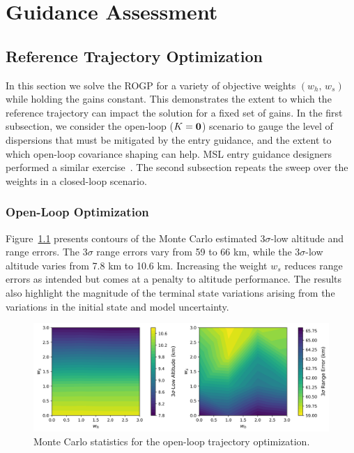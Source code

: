 \chapter{Guidance Assessment}\label{Ch:NumericalAssessment}

\section{Reference Trajectory Optimization}
In this section we solve the ROGP for a variety of objective weights $(w_h,\,w_s)$ while holding the gains constant. This demonstrates the extent to which the reference trajectory can impact the solution for a fixed set of gains. In the first subsection, we consider the open-loop ($K=\mathbf{0}$) scenario to gauge the level of dispersions that must be mitigated by the entry guidance, and the extent to which open-loop covariance shaping can help. MSL entry guidance designers performed a similar exercise~\cite{MSL_EDL2}. The second subsection repeats the sweep over the weights in a closed-loop scenario.

\subsection{Open-Loop Optimization}
Figure~\ref{Fig:MCResultsOpenLoop} presents contours of the Monte Carlo estimated 3$\sigma$-low altitude and range errors. The 3$\sigma$ range errors vary from 59 to 66 km, while the 3$\sigma$-low altitude varies from 7.8 km to 10.6 km. Increasing the weight $w_s$ reduces range errors as intended but comes at a penalty to altitude performance. The results also highlight the magnitude of the terminal state variations arising from the variations in the initial state and model uncertainty. 
\begin{figure}[h!]
	\centering
	\includegraphics[width=1\textwidth]{Images/OpenLoop_WeightSweepMCResults}
	\caption{Monte Carlo statistics for the open-loop trajectory optimization. }
	\label{Fig:MCResultsOpenLoop}
\end{figure}

